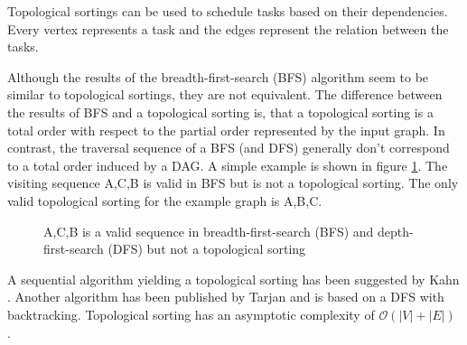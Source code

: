 Topological sortings can be  used to schedule tasks based on their dependencies. Every vertex represents a task and the edges represent the relation between the tasks.

Although the results of the breadth-first-search (BFS) algorithm seem to be similar to topological sortings, they are not equivalent. The difference between the results of BFS and a topological sorting is, that a topological sorting is a total order with respect to the partial order represented by the input graph. In contrast, the traversal sequence of a BFS (and DFS) generally don’t correspond to a total order induced by a DAG. A simple example is shown in figure \ref{fig:diff-bfs}. The visiting sequence A,C,B is valid in BFS but is not a topological sorting. The only valid topological sorting for the example graph is A,B,C.


\begin{figure}[!hbp]
\centering
 

\caption{A,C,B is a valid sequence in breadth-first-search (BFS) and depth-first-search (DFS) but not a topological sorting}
\label{fig:diff-bfs}
\end{figure}

A sequential algorithm yielding a topological sorting has been suggested by Kahn \cite{kahn1962topological}. Another algorithm has been published by Tarjan  \cite{tarjan1976edge} and is based on a DFS with backtracking. Topological sorting has an asymptotic complexity of $\mathcal{O}(|V|+|E|)$ \cite[Chapter~22.4]{cormen2001introduction}. 

